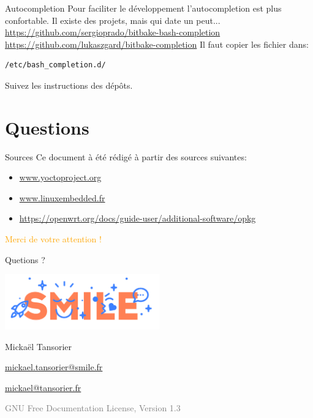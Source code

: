 \documentclass[compress]{beamer}
\begin{document}
\begin{frame}[fragile]{Autocompletion}
Pour faciliter le développement l'autocompletion est plus confortable.\newline
\newline
Il existe des projets, mais qui date un peut...
\url{https://github.com/sergioprado/bitbake-bash-completion}
\url{https://github.com/lukaszgard/bitbake-completion}\newline
\newline
Il faut copier les fichier dans:
\begin{lstlisting}[style=shell]
/etc/bash_completion.d/
\end{lstlisting}
Suivez les instructions des dépôts.
\end{frame}


\section*{Questions}

\begin{frame}{Sources}
Ce document à été rédigé à partir des sources suivantes:\newline
\begin{itemize}
	\item \url{www.yoctoproject.org}
	\item \url{www.linuxembedded.fr}
	\item \url{https://openwrt.org/docs/guide-user/additional-software/opkg}
\end{itemize}
\end{frame}

\begin{frame}
\centering
\textcolor{orange}{\huge{Merci de votre attention !}}

\textcolor[RGB]{99,153,253}{Quetions ?}

\includegraphics[width=0.5\textwidth]{logos/smile-logo.png}

Mickaël Tansorier

\url{mickael.tansorier@smile.fr}

\url{mickael@tansorier.fr}

\vfill
\textcolor{gray}{\tiny{GNU Free Documentation License, Version 1.3}}
\end{frame}
\end{document}
